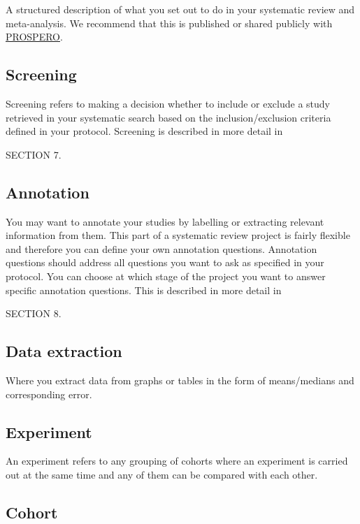 \documentclass[
]{book}
\begin{document}
A structured description of what you set out to do in your systematic review and meta-analysis. We recommend that this is published or shared publicly with \href{https://www.crd.york.ac.uk/prospero/}{PROSPERO}.

\hypertarget{screening}{%
\subsection{Screening}\label{screening}}

Screening refers to making a decision whether to include or exclude a study retrieved in your systematic search based on the inclusion/exclusion criteria defined in your protocol. Screening is described in more detail in

SECTION 7.

\hypertarget{annotation}{%
\subsection{Annotation}\label{annotation}}

You may want to annotate your studies by labelling or extracting relevant information from them. This part of a systematic review project is fairly flexible and therefore you can define your own annotation questions. Annotation questions should address all questions you want to ask as specified in your protocol. You can choose at which stage of the project you want to answer specific annotation questions. This is described in more detail in

SECTION 8.

\hypertarget{data-extraction}{%
\subsection{Data extraction}\label{data-extraction}}

Where you extract data from graphs or tables in the form of means/medians and corresponding error.

\hypertarget{experiment}{%
\subsection{Experiment}\label{experiment}}

An experiment refers to any grouping of cohorts where an experiment is carried out at the same time and any of them can be compared with each other.

\hypertarget{cohort}{%
\subsection{Cohort}\label{cohort}}
\end{document}
